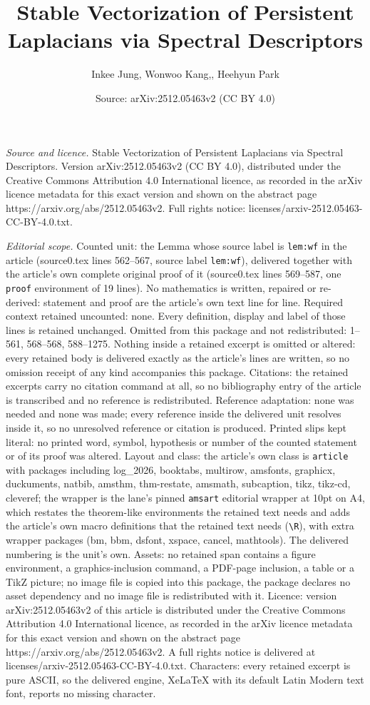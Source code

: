 \documentclass[10pt,a4paper]{amsart}
\title[Stable Vectorization of Persistent Laplacians via Spectral D]{Stable Vectorization of Persistent Laplacians via Spectral Descriptors}
\author{Inkee Jung, Wonwoo Kang,, Heehyun Park}
\date{Source: arXiv:2512.05463v2 (CC BY 4.0)}
\begin{document}
\maketitle

\noindent\emph{Source and licence.} Stable Vectorization of Persistent Laplacians via Spectral Descriptors. Version arXiv:2512.05463v2 (CC BY 4.0), distributed under the Creative Commons Attribution 4.0 International licence, as recorded in the arXiv licence metadata for this exact version and shown on the abstract page https://arxiv.org/abs/2512.05463v2. Full rights notice: licenses/arxiv-2512.05463-CC-BY-4.0.txt.\par\smallskip

\noindent\textit{Editorial scope.} Counted unit: the Lemma whose source label is \texttt{lem:wf} in the article (source0.tex lines 562--567, source label \texttt{lem:wf}), delivered together with the article's own complete original proof of it (source0.tex lines 569--587, one \texttt{proof} environment of 19 lines). No mathematics is written, repaired or re-derived: statement and proof are the article's own text line for line. Required context retained uncounted: none. Every definition, display and label of those lines is retained unchanged. Omitted from this package and not redistributed: 1--561, 568--568, 588--1275. Nothing inside a retained excerpt is omitted or altered: every retained body is delivered exactly as the article's lines are written, so no omission receipt of any kind accompanies this package. Citations: the retained excerpts carry no citation command at all, so no bibliography entry of the article is transcribed and no reference is redistributed. Reference adaptation: none was needed and none was made; every reference inside the delivered unit resolves inside it, so no unresolved reference or citation is produced. Printed slips kept literal: no printed word, symbol, hypothesis or number of the counted statement or of its proof was altered. Layout and class: the article's own class is \texttt{article} with packages including log\_2026, booktabs, multirow, amsfonts, graphicx, duckuments, natbib, amsthm, thm-restate, amsmath, subcaption, tikz, tikz-cd, cleveref; the wrapper is the lane's pinned \texttt{amsart} editorial wrapper at 10pt on A4, which restates the theorem-like environments the retained text needs and adds the article's own macro definitions that the retained text needs (\texttt{\textbackslash R}), with extra wrapper packages (bm, bbm, dsfont, xspace, cancel, mathtools). The delivered numbering is the unit's own. Assets: no retained span contains a figure environment, a graphics-inclusion command, a PDF-page inclusion, a table or a TikZ picture; no image file is copied into this package, the package declares no asset dependency and no image file is redistributed with it. Licence: version arXiv:2512.05463v2 of this article is distributed under the Creative Commons Attribution 4.0 International licence, as recorded in the arXiv licence metadata for this exact version and shown on the abstract page https://arxiv.org/abs/2512.05463v2. A full rights notice is delivered at licenses/arxiv-2512.05463-CC-BY-4.0.txt. Characters: every retained excerpt is pure ASCII, so the delivered engine, XeLaTeX with its default Latin Modern text font, reports no missing character.
\end{document}
